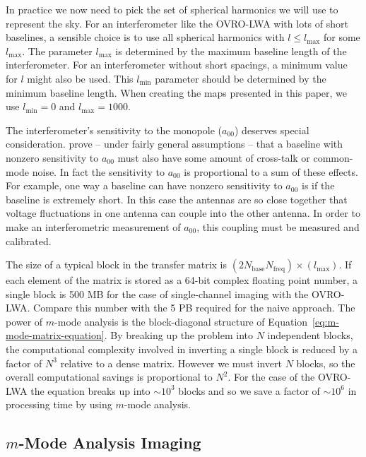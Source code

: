 \documentclass[twocolumn]{aastex61}
\begin{document}
In practice we now need to pick the set of spherical harmonics we will use to represent the sky. For
an interferometer like the OVRO-LWA with lots of short baselines, a sensible choice is to use all
spherical harmonics with $l\le l_\text{max}$ for some $l_\text{max}$. The parameter $l_\text{max}$
is determined by the maximum baseline length of the interferometer.  For an interferometer without
short spacings, a minimum value for $l$ might also be used. This $l_\text{min}$ parameter should be
determined by the minimum baseline length.  When creating the maps presented in this paper, we use
$l_\text{min} = 0$ and $l_\text{max} = 1000$.

The interferometer's sensitivity to the monopole ($a_{00}$) deserves special consideration.
\citet{2016ApJ...826..116V} prove -- under fairly general assumptions -- that a baseline with
nonzero sensitivity to $a_{00}$ must also have some amount of cross-talk or common-mode noise.  In
fact the sensitivity to $a_{00}$ is proportional to a sum of these effects. For example, one way a
baseline can have nonzero sensitivity to $a_{00}$ is if the baseline is extremely short. In this
case the antennas are so close together that voltage fluctuations in one antenna can couple into the
other antenna. In order to make an interferometric measurement of $a_{00}$, this coupling must be
measured and calibrated.

The size of a typical block in the transfer matrix is
$(2N_\text{base}N_\text{freq})\times(l_\text{max})$. If each element of the matrix is stored as a
64-bit complex floating point number, a single block is 500 MB for the case of single-channel
imaging with the OVRO-LWA. Compare this number with the 5 PB required for the naive approach.  The
power of $m$-mode analysis is the block-diagonal structure of
Equation~\ref{eq:m-mode-matrix-equation}.  By breaking up the problem into $N$ independent blocks,
the computational complexity involved in inverting a single block is reduced by a factor of $N^3$
relative to a dense matrix. However we must invert $N$ blocks, so the overall computational savings
is proportional to $N^2$.  For the case of the OVRO-LWA the equation breaks up into $\sim10^3$
blocks and so we save a factor of $\sim10^6$ in processing time by using $m$-mode analysis.

\subsection{$m$-Mode Analysis Imaging}
\end{document}
